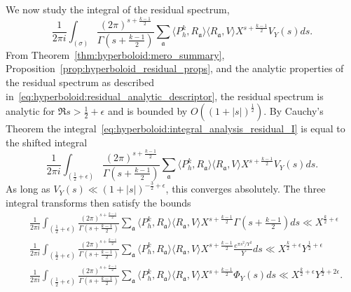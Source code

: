 We now study the integral of the residual spectrum,
\begin{equation}\label{eq:hyperboloid:integral_analysis_residual_I}
  \frac{1}{2\pi i} \int_{(\sigma)} \frac{(2\pi)^{s + \frac{k-1}{2}}}{\Gamma(s +
  \frac{k-1}{2})} \sum_\mathfrak{a} \langle P_h^k, R_\mathfrak{a}\rangle \langle
R_\mathfrak{a}, V \rangle X^{s + \frac{k-1}{2}} V_Y(s) ds.
\end{equation}
From Theorem~\ref{thm:hyperboloid:mero_summary},
Proposition~\ref{prop:hyperboloid_residual_props}, and the analytic properties of the
residual spectrum as described in~\eqref{eq:hyperboloid:residual_analytic_descriptor}, the
residual spectrum is analytic for $\Re s > \frac{1}{2} + \epsilon$ and is bounded by $O((1
+ \lvert s \rvert)^{\frac{1}{2}})$.
By Cauchy's Theorem the integral~\eqref{eq:hyperboloid:integral_analysis_residual_I} is
equal to the shifted integral
\begin{equation}
  \frac{1}{2\pi i} \int_{(\frac{1}{2} + \epsilon)} \frac{(2\pi)^{s +
  \frac{k-1}{2}}}{\Gamma(s + \frac{k-1}{2})} \sum_\mathfrak{a} \langle P_h^k,
  R_\mathfrak{a}\rangle \langle R_\mathfrak{a}, V \rangle X^{s + \frac{k-1}{2}} V_Y(s) ds.
\end{equation}
As long as $V_Y(s) \ll (1 + \lvert s \rvert)^{-\frac{3}{2} + \epsilon}$, this converges
absolutely.
The three integral transforms then satisfy the bounds
\begin{align}
  &\frac{1}{2\pi i} \int_{(\frac{1}{2} + \epsilon)} \frac{(2\pi)^{s +
  \frac{k-1}{2}}}{\Gamma(s + \frac{k-1}{2})} \sum_\mathfrak{a} \langle P_h^k,
    R_\mathfrak{a}\rangle \langle R_\mathfrak{a}, V \rangle X^{s + \frac{k-1}{2}} \Gamma(s
    + \tfrac{k-1}{2}) ds \ll X^{\frac{k}{2} + \epsilon}
  \label{eq:hyperboloid:residual_gamma_integral_bound} \\
  &\frac{1}{2\pi i} \int_{(\frac{1}{2} + \epsilon)} \frac{(2\pi)^{s +
  \frac{k-1}{2}}}{\Gamma(s + \frac{k-1}{2})} \sum_\mathfrak{a} \langle P_h^k,
  R_\mathfrak{a}\rangle \langle R_\mathfrak{a}, V \rangle X^{s + \frac{k-1}{2}}
  \frac{e^{\pi s^2/Y^2}}{Y} ds \ll X^{\frac{k}{2} + \epsilon} Y^{\frac{1}{2} + \epsilon}
  \label{eq:hyperboloid:residual_concentrating_integral_bound} \\
  &\frac{1}{2\pi i} \int_{(\frac{1}{2} + \epsilon)} \frac{(2\pi)^{s +
  \frac{k-1}{2}}}{\Gamma(s + \frac{k-1}{2})} \sum_\mathfrak{a} \langle P_h^k,
  R_\mathfrak{a}\rangle \langle R_\mathfrak{a}, V \rangle X^{s + \frac{k-1}{2}} \Phi_Y(s)
  ds \ll X^{\frac{k}{2} + \epsilon} Y^{\frac{1}{2} + 2\epsilon}.
  \label{eq:hyperboloid:residual_compact_integral_bound}
\end{align}



